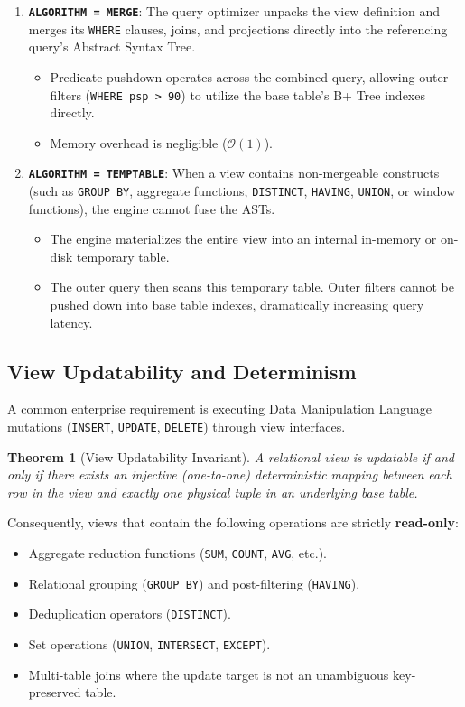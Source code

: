 \documentclass[10pt,twocolumn,letterpaper]{article}
\newtheorem{theorem}{Theorem}
\begin{document}
\begin{enumerate}
    \item \textbf{\texttt{ALGORITHM = MERGE}}: The query optimizer unpacks the view definition and merges its \texttt{WHERE} clauses, joins, and projections directly into the referencing query's Abstract Syntax Tree.
    \begin{itemize}
        \item Predicate pushdown operates across the combined query, allowing outer filters (\texttt{WHERE psp > 90}) to utilize the base table's B+ Tree indexes directly.
        \item Memory overhead is negligible ($\mathcal{O}(1)$).
    \end{itemize}
    \item \textbf{\texttt{ALGORITHM = TEMPTABLE}}: When a view contains non-mergeable constructs (such as \texttt{GROUP BY}, aggregate functions, \texttt{DISTINCT}, \texttt{HAVING}, \texttt{UNION}, or window functions), the engine cannot fuse the ASTs.
    \begin{itemize}
        \item The engine materializes the entire view into an internal in-memory or on-disk temporary table.
        \item The outer query then scans this temporary table. Outer filters cannot be pushed down into base table indexes, dramatically increasing query latency.
    \end{itemize}
\end{enumerate}

\subsection{View Updatability and Determinism}
A common enterprise requirement is executing Data Manipulation Language mutations (\texttt{INSERT}, \texttt{UPDATE}, \texttt{DELETE}) through view interfaces.
\begin{theorem}[View Updatability Invariant]
A relational view is updatable if and only if there exists an injective (one-to-one) deterministic mapping between each row in the view and exactly one physical tuple in an underlying base table.
\end{theorem}
Consequently, views that contain the following operations are strictly \textbf{read-only}:
\begin{itemize}
    \item Aggregate reduction functions (\texttt{SUM}, \texttt{COUNT}, \texttt{AVG}, etc.).
    \item Relational grouping (\texttt{GROUP BY}) and post-filtering (\texttt{HAVING}).
    \item Deduplication operators (\texttt{DISTINCT}).
    \item Set operations (\texttt{UNION}, \texttt{INTERSECT}, \texttt{EXCEPT}).
    \item Multi-table joins where the update target is not an unambiguous key-preserved table.
\end{itemize}
\end{document}
